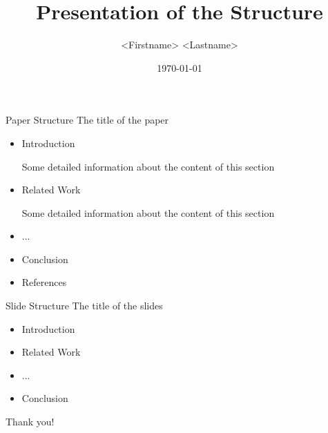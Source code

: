 \documentclass[]{beamer} %
\title{Presentation of the Structure}
\author{<Firstname> <Lastname>}
\date{\today}
\begin{document}
\maketitle


\begin{frame}{Paper Structure}
	The title of the paper
	\begin{itemize}
		\item Introduction
	
			Some detailed information about the content of this section

		\item Related Work

			Some detailed information about the content of this section

		\item ...

		\item Conclusion

		\item References
	\end{itemize}
\end{frame}

\begin{frame}{Slide Structure}
	The title of the slides
	\begin{itemize}
		\item Introduction
		\item Related Work
		\item ...
		\item Conclusion
	\end{itemize}
\end{frame}

\begin{titleframe}
	\begin{center}
	\alert{\Large Thank you!}
	\end{center}
\end{titleframe}
\end{document}
